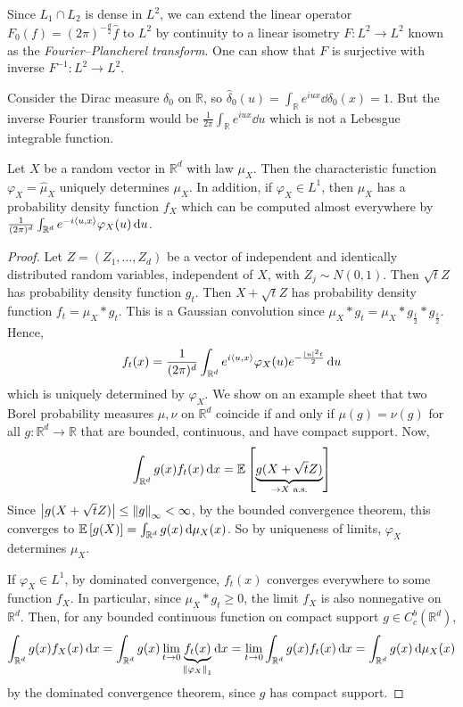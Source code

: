 \begin{remark}
	Since \( L_1 \cap L_2 \) is dense in \( L^2 \), we can extend the linear operator \( F_0(f) = (2\pi)^{-\frac{d}{2}} \hat f \) to \( L^2 \) by continuity to a linear isometry \( F \colon L^2 \to L^2 \) known as the \emph{Fourier--Plancherel transform}.
	One can show that \( F \) is surjective with inverse \( F^{-1} \colon L^2 \to L^2 \).
\end{remark}
\begin{example}
	Consider the Dirac measure \( \delta_0 \) on \( \mathbb R \), so \( \hat \delta_0(u) = \int_{\mathbb R} e^{iux} \dd{\delta_0(x)} = 1 \).
	But the inverse Fourier transform would be \( \frac{1}{2\pi} \int_{\mathbb R} e^{iux} \dd{u} \) which is not a Lebesgue integrable function.
\end{example}
\begin{theorem}
	Let \( X \) be a random vector in \( \mathbb R^d \) with law \( \mu_X \).
	Then the characteristic function \( \varphi_X = \hat \mu_X \) uniquely determines \( \mu_X \).
	In addition, if \( \varphi_X \in L^1 \), then \( \mu_X \) has a probability density function \( f_X \) which can be computed almost everywhere by \( \frac{1}{(2\pi)^d} \int_{\mathbb R^d} e^{-i\left\langle{u,x}\right\rangle} \varphi_X(u) \dd{u} \).
\end{theorem}
\begin{proof}
	Let \( Z = (Z_1, \dots, Z_d) \) be a vector of independent and identically distributed random variables, independent of \( X \), with \( Z_j \sim N(0,1) \).
	Then \( \sqrt{t} Z \) has probability density function \( g_t \).
	Then \( X + \sqrt{t} Z \) has probability density function \( f_t = \mu_X \ast g_t \).
	This is a Gaussian convolution since \( \mu_X \ast g_t = \mu_X \ast g_{\frac t 2} \ast g_{\frac t 2} \).
	Hence,
	\[ f_t(x) = \frac{1}{(2\pi)^d} \int_{\mathbb R^d} e^{i\left\langle{u,x}\right\rangle} \varphi_X(u) e^{-\frac{\abs{u}^2 t}{2}} \dd{u} \]
	which is uniquely determined by \( \varphi_X \).
	We show on an example sheet that two Borel probability measures \( \mu, \nu \) on \( \mathbb R^d \) coincide if and only if \( \mu(g) = \nu(g) \) for all \( g \colon \mathbb R^d \to \mathbb R \) that are bounded, continuous, and have compact support.
	Now,
	\[ \int_{\mathbb R^d} g(x) f_t(x) \dd{x} = \mathbb{E}\left[{\underbrace{g(X + \sqrt{t} Z)}_{\to X \text{ a.s.}}}\right] \]
	Since \( \abs{g(X + \sqrt{t}Z)} \leq \norm{g}_\infty < \infty \), by the bounded convergence theorem, this converges to \( \mathbb{E}\left[{g(X)}\right] = \int_{\mathbb R^d} g(x) \dd{\mu_X(x)} \).
	So by uniqueness of limits, \( \varphi_X \) determines \( \mu_X \).

	If \( \varphi_X \in L^1 \), by dominated convergence, \( f_t(x) \) converges everywhere to some function \( f_X \).
	In particular, since \( \mu_X \ast g_t \geq 0 \), the limit \( f_X \) is also nonnegative on \( \mathbb R^d \).
	Then, for any bounded continuous function on compact support \( g \in C^b_c(\mathbb R^d) \),
	\[ \int_{\mathbb R^d} g(x) f_X(x) \dd{x} = \int_{\mathbb R^d} g(x) \lim_{t \to 0} \underbrace{f_t(x)}_{\norm{\varphi_X}_1} \dd{x} = \lim_{t \to 0} \int_{\mathbb R^d} g(x) f_t(x) \dd{x} = \int_{\mathbb R^d} g(x) \dd{\mu_X(x)} \]
	by the dominated convergence theorem, since \( g \) has compact support.
\end{proof}
